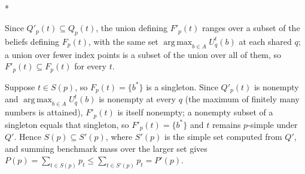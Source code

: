 \documentclass[12pt]{article}
\makeatletter
\theoremstyle{definition}
\renewenvironment{proof}[1][\proofname]{\par
  \pushQED{\qed}%
  \normalfont \topsep6\p@\@plus6\p@\relax
  \trivlist
  \item[\hskip\labelsep\itshape #1\@addpunct{.}]\mbox{}\\*
  \ignorespaces
}{%
  \popQED\endtrivlist\@endpefalse
}
\DeclareMathOperator*{\argmax}{arg\,max}
\makeatother
\begin{document}
\begin{proof}[Proof of Remark \ref{rem:mono}]
Since $Q'_p(t) \subseteq Q_p(t)$, the union defining $F'_p(t)$ ranges over a subset of the beliefs defining $F_p(t)$, with the same set $\argmax_{b \in A} U^t_q(b)$ at each shared $q$; a union over fewer index points is a subset of the union over all of them, so $F'_p(t) \subseteq F_p(t)$ for every $t$.

Suppose $t \in S(p)$, so $F_p(t) = \{b^*\}$ is a singleton. Since $Q'_p(t)$ is nonempty and $\argmax_{b \in A} U^t_q(b)$ is nonempty at every $q$ (the maximum of finitely many numbers is attained), $F'_p(t)$ is itself nonempty; a nonempty subset of a singleton equals that singleton, so $F'_p(t) = \{b^*\}$ and $t$ remains $p$-simple under $Q'$. Hence $S(p) \subseteq S'(p)$, where $S'(p)$ is the simple set computed from $Q'$, and summing benchmark mass over the larger set gives $P(p) = \sum_{t \in S(p)} p_t \le \sum_{t \in S'(p)} p_t = P'(p)$.
\end{proof}
\end{document}
